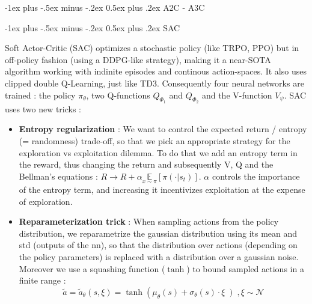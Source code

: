 \documentclass[10pt,landscape]{article}
\makeatletter
\renewcommand{\section}{\@startsection{section}{1}{0mm}%
                                {-1ex plus -.5ex minus -.2ex}%
                                {0.5ex plus .2ex}%
                                {\normalfont\large\bfseries}}
\makeatother
\begin{document}
\begin{multicols}{3}
\section{A2C - A3C}



\section{SAC}

Soft Actor-Critic (SAC) optimizes a stochastic policy (like TRPO, PPO) but in off-policy fashion (using a DDPG-like strategy), making it a near-SOTA algorithm working with indinite episodes and continous action-spaces.
It also uses clipped double Q-Learning, just like TD3. Consequently four neural networks are trained : the policy $\pi_\theta$, two Q-functions $Q_{\Phi_1}$ and $Q_{\Phi_2}$ and the V-function $V_\psi$. 
SAC uses two new tricks :

\begin{itemize}[leftmargin=*]
    \item \textbf{Entropy regularization} :  We want to control the expected return / entropy (= randomness) trade-off, so that we pick an appropriate strategy for the exploration vs exploitation dilemma. To do that we add an entropy term in the reward, thus changing the return and subsequently V, Q and the Bellman's equations : $R \rightarrow R + \alpha \underset{x \sim \pi}{\mathbb{E}} \left [ \pi(\cdot | s_t) \right ]$. $\alpha$ controls the importance of the entropy term, and increasing it incentivizes exploitation at the expense of exploration.
    \item \textbf{Reparameterization trick} : When sampling actions from the policy distribution, we reparametrize the gaussian distribution using its mean and std (outputs of the nn), so that the distribution over actions (depending on the policy parameters) is replaced with a distribution over a gaussian noise. Moreover we use a squashing function ($\tanh$) to bound sampled actions in a finite range : 
    $$\tilde{a} = \tilde{a}_\theta(s, \xi) = \tanh \left ( \mu_\theta(s) + \sigma_\theta(s) \cdot \xi \left ), \xi \sim \mathcal{N}$$
\end{itemize}



\end{multicols}
\end{document}
